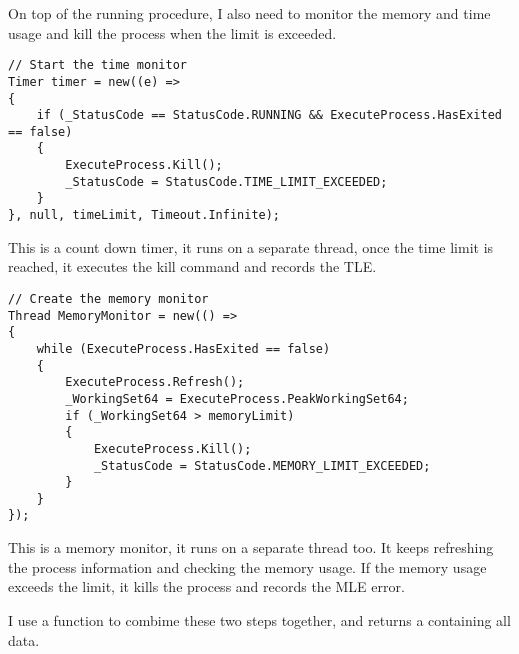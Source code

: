 \documentclass[report.tex]{subfiles}
\begin{document}
On top of the running procedure, I also need to monitor the memory and time usage and kill the process when the limit is exceeded.

\begin{verbatim}
// Start the time monitor
Timer timer = new((e) =>
{
    if (_StatusCode == StatusCode.RUNNING && ExecuteProcess.HasExited == false)
    {
        ExecuteProcess.Kill();
        _StatusCode = StatusCode.TIME_LIMIT_EXCEEDED;
    }
}, null, timeLimit, Timeout.Infinite);
\end{verbatim}

This is a count down timer, it runs on a separate thread, once the time limit is reached, it executes the kill command and records the TLE.

\begin{verbatim}
// Create the memory monitor
Thread MemoryMonitor = new(() =>
{
    while (ExecuteProcess.HasExited == false)
    {
        ExecuteProcess.Refresh();
        _WorkingSet64 = ExecuteProcess.PeakWorkingSet64;
        if (_WorkingSet64 > memoryLimit)
        {
            ExecuteProcess.Kill();
            _StatusCode = StatusCode.MEMORY_LIMIT_EXCEEDED;
        }
    }
});
\end{verbatim}

This is a memory monitor, it runs on a separate thread too. It keeps refreshing the process information and checking the memory usage. If the memory usage exceeds the limit, it kills the process and records the MLE error.

I use a  function to combime these two steps together, and returns a  containing all data.
\end{document}
